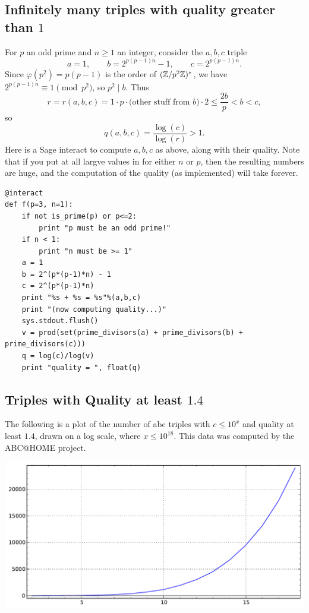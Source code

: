 \documentclass{book}
\begin{document}
\subsection{Infinitely many triples with quality greater than $1$}
For $p$ an odd prime and $n\geq 1$ an integer, consider the $a,b,c$ triple
$$
a = 1,\qquad b = 2^{p(p-1)n}-1, \qquad c = 2^{p(p-1)n}.
$$
Since $\varphi(p^2)=p(p-1)$ is the order of $(\mathbb{Z}/p^2\mathbb{Z})^*$,
we have $2^{p(p-1)n}\equiv 1 \pmod{p^2}$,
so $p^2 \mid b$.
Thus
$$
 r = r(a,b,c) = 1 \cdot p \cdot\text{(other stuff from $b$)} \cdot 2
     \leq \frac{2b}{p} < b < c,
$$
so
$$
 q(a,b,c) = \frac{\log(c)}{\log(r)} > 1.
$$
Here is a Sage interact to compute $a,b,c$ as above, along with their quality.
Note that if you put at all largve values in for either $n$ or $p$,
then the resulting numbers are huge, and the computation of the quality
(as implemented) will take forever.
\begin{lstlisting}
@interact
def f(p=3, n=1):
    if not is_prime(p) or p<=2:
        print "p must be an odd prime!"
    if n < 1:
        print "n must be >= 1"
    a = 1
    b = 2^(p*(p-1)*n) - 1
    c = 2^(p*(p-1)*n)
    print "%s + %s = %s"%(a,b,c)
    print "(now computing quality...)"
    sys.stdout.flush()
    v = prod(set(prime_divisors(a) + prime_divisors(b) + prime_divisors(c)))
    q = log(c)/log(v)
    print "quality = ", float(q)
\end{lstlisting}

\subsection{Triples with Quality at least $1.4$}\label{sec:abchome}
The following is a plot of the number of abc triples with $c\leq 10^x$
and quality at least $1.4$, drawn on a log scale,
where $x\leq 10^{18}$.  This data was computed by the ABC@HOME project.
\begin{center}
\includegraphics[width=.7\textwidth]{pics/abcplot.pdf}
\end{center}
\end{document}
